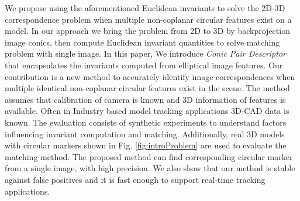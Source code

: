 \documentclass{bmvc2k}
\newcommand{\yuji}[1]{\textcolor{magenta}{[Yuji: #1]}}
\begin{document}
\par 
We propose using the aforementioned Euclidean invariants to solve the 2D-3D correspondence problem when multiple non-coplanar circular features exist on a model.
In our approach we bring the problem from 2D to 3D by backprojection image conics, then compute Euclidean invariant quantities to solve matching problem with single image.
In this paper, We introduce \textit{Conic Pair Descriptor} that encapsulates the invariants computed from elliptical image features.
Our contribution is a new method to accurately identify image correspondences when multiple identical non-coplanar circular features exist in the scene. 
The method assumes that calibration of camera is known and 3D information of features is available. 
Often in Industry based model tracking applications 3D-CAD data is known. 
The evaluation consists of synthetic experiments to understand factors influencing invariant computation and matching. 
Additionally, real 3D models with circular markers shown in Fig. \ref{fig:introProblem} are used to evaluate the matching method.
The proposed method can find corresponding circular marker from a single image, with high precision.
We also show that our method is stable against false positives and it is fast enough to support real-time tracking applications. 


\end{document}
